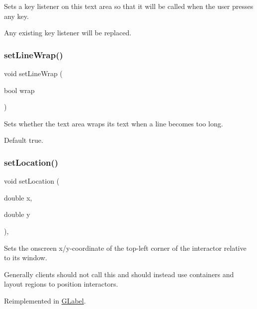 Sets a key listener on this text area so that it will be called when the user presses any key. 

Any existing key listener will be replaced. \mbox{\label{classGTextArea_aaaafb06fec060b28b70ec3b7379657b4}} 
\subsubsection{\texorpdfstring{set\+Line\+Wrap()}{setLineWrap()}}
{\footnotesize\ttfamily void set\+Line\+Wrap (\begin{DoxyParamCaption}\item[{bool}]{wrap }\end{DoxyParamCaption})\hspace{0.3cm}{\ttfamily [virtual]}}



Sets whether the text area wraps its text when a line becomes too long. 

Default true. \mbox{\label{classGInteractor_a04594e8ba9b98513a64f1da00dcae18c}} 
\subsubsection{\texorpdfstring{set\+Location()}{setLocation()}}
{\footnotesize\ttfamily void set\+Location (\begin{DoxyParamCaption}\item[{double}]{x,  }\item[{double}]{y }\end{DoxyParamCaption})\hspace{0.3cm}{\ttfamily [virtual]}, {\ttfamily [inherited]}}



Sets the onscreen x/y-\/coordinate of the top-\/left corner of the interactor relative to its window. 

Generally clients should not call this and should instead use containers and layout regions to position interactors. 

Reimplemented in \mbox{\hyperlink{classGLabel_a40e39a7bf1b0b46b3a5710bb9a0d214b}{G\+Label}}.

